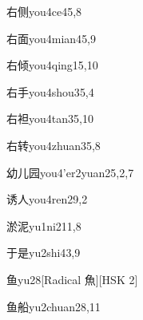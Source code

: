 \begin{entry}{右侧}{you4ce4}{5,8}
\end{entry}

\begin{entry}{右面}{you4mian4}{5,9}
\end{entry}

\begin{entry}{右倾}{you4qing1}{5,10}
\end{entry}

\begin{entry}{右手}{you4shou3}{5,4}
\end{entry}

\begin{entry}{右袒}{you4tan3}{5,10}
\end{entry}

\begin{entry}{右转}{you4zhuan3}{5,8}
\end{entry}

\begin{entry}{幼儿园}{you4'er2yuan2}{5,2,7}
\end{entry}

\begin{entry}{诱人}{you4ren2}{9,2}
\end{entry}

\begin{entry}{淤泥}{yu1ni2}{11,8}
\end{entry}

\begin{entry}{于是}{yu2shi4}{3,9}
\end{entry}

\begin{entry}{鱼}{yu2}{8}[Radical 魚][HSK 2]
\end{entry}

\begin{entry}{鱼船}{yu2chuan2}{8,11}
\end{entry}

